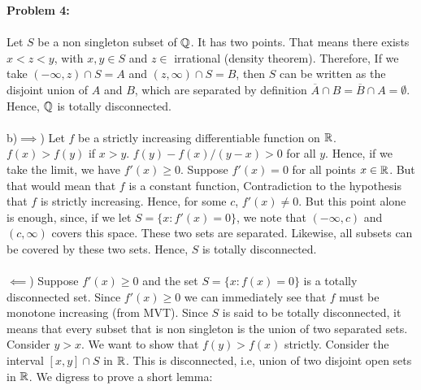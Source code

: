 \documentclass[../Main.tex]{subfiles}
\begin{document}
\newpage
\textbf{Problem 4:}
\\\\ Let $S$ be a non singleton subset of $\mathbb Q$. It has two points. That means there exists $x<z<y$, with $x,y \in S$ and $z \in $ irrational (density theorem). Therefore, If we take $(-\infty,z) \cap S=A$ and $(z,\infty) \cap S=B$, then $S$ can be written as the disjoint union of $A$ and $B$, which are separated by definition $\overline{A} \cap B= \overline{B} \cap A= \emptyset$. Hence, $\mathbb Q$ is totally disconnected.
\\\\ b)$\implies$) Let $f$ be a strictly increasing differentiable function on $\mathbb R$. $f(x)>f(y)$ if $x>y$. $f(y)-f(x)/(y-x) > 0$ for all $y$. Hence, if we take the limit, we have $f'(x) \geq 0$. Suppose $f'(x)=0$ for all points $x \in \mathbb R$. But that would mean that $f$ is a constant function, Contradiction to the hypothesis that $f$ is strictly increasing. Hence, for some $c$, $f'(x)\neq 0$. But this point alone is enough, since, if we let $S=\{x: f'(x)=0\}$, we note that $(-\infty,c)$ and $(c,\infty)$ covers this space. These two sets are separated. Likewise, all subsets can be covered by these two sets. Hence, $S$ is totally disconnected.
\\\\ $\impliedby$) Suppose $f'(x) \geq 0$ and the set $S=\{x: f(x)=0\}$ is a totally disconnected set. Since $f'(x) \geq 0$ we can immediately see that $f$ must be monotone increasing (from MVT). Since $S$ is said to be totally disconnected, it means that every subset that is non singleton is the union of two separated sets. Consider $y>x$. We want to show that $f(y)>f(x)$ strictly. Consider the interval $[x,y] \cap S$ in $\mathbb R$. This is disconnected, i.e, union of two disjoint open sets in $\mathbb R$. We digress to prove a short lemma:
\end{document}
